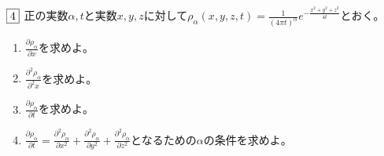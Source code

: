 \documentclass[dvipdfmx]{jsreport}
\begin{document}
\begin{tcolorbox} %
	$\fbox{4}$ 正の実数$\alpha, t$と実数$x, y, z$に対して$\rho_\alpha(x, y, z, t)= \frac{1}{(4\pi t)^\alpha}e^{-\frac{x^2+ y^2+ z^2}{4t}}$とおく。
\begin{enumerate}
	\item $\frac{\partial \rho_\alpha}{\partial x}$を求めよ。
	\item $\frac{\partial^2 \rho_\alpha}{\partial^2 x}$を求めよ。
	\item $\frac{\partial \rho_\alpha}{\partial t}$を求めよ。
	\item $\frac{\partial \rho_\alpha}{\partial t}= \frac{\partial^2 \rho_\alpha}{\partial x^2}+ \frac{\partial^2 \rho_\alpha}{\partial y^2}+ \frac{\partial^2 \rho_\alpha}{\partial z^2}$となるための$\alpha$の条件を求めよ。
\end{enumerate}
\end{tcolorbox}
\end{document}
